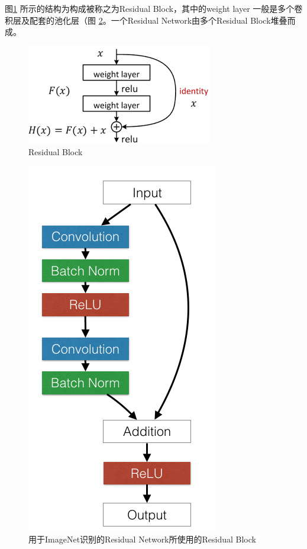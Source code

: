 图\ref{Fig:ResBlock} 所示的结构为构成被称之为Residual Block，其中的weight layer
一般是多个卷积层及配套的池化层（图 \ref{Fig:ResBlockActual}。一个Residual
Network由多个Residual Block堆叠而成。

\begin{figure}
  \centering
  \includegraphics{./Figure/ResBlock.png}
  \caption{Residual Block\cite{He:2015tt}}\label{Fig:ResBlock}
\end{figure}

\begin{figure}
  \centering
  \includegraphics{./Figure/ResBlockActual.png}
  \caption{用于ImageNet识别的Residual Network所使用的Residual
    Block}\label{Fig:ResBlockActual}
\end{figure}

